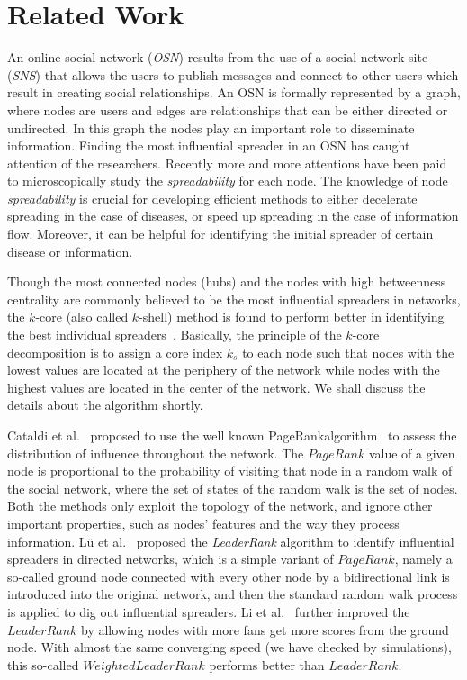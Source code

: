 \documentclass[sigconf]{acmart}
\begin{document}
\section{Related Work}
An online social network (\emph{OSN}) results from the use of a social network site (\emph{SNS}) that allows the users to publish messages and connect to other users which result in creating social relationships. An OSN is formally represented by a graph, where nodes are users and edges are relationships that can be either directed or undirected. In this graph the nodes play an important role to disseminate information. Finding the most influential spreader in an OSN has caught attention of the researchers. Recently more and more attentions have been paid to microscopically study the \emph{spreadability} for each node. The knowledge of node \emph{spreadability} is crucial for developing efficient methods to either decelerate spreading in the case of diseases, or speed up spreading in the case of information flow. Moreover, it can be helpful for identifying the initial spreader of certain disease or information.

Though the most connected nodes (hubs) and the nodes with high betweenness centrality are commonly believed to be the most influential spreaders in networks, the $k$-core (also called $k$-shell) method is found to perform better in identifying the best individual spreaders~\cite{kitsak2010identification,carmi2007model}. Basically, the principle of
the $k$-core decomposition is to assign a core index $k_s$ to each node such that nodes with the lowest values are located at the periphery of the network while nodes with the highest values are located in the center of the network. We shall discuss the details about the algorithm shortly. 

Cataldi et al.~\cite{cataldi2010emerging} proposed to use the well known PageRankalgorithm~\cite{page1999pagerank} to assess the distribution of influence throughout the network. The $PageRank$ value of a given node is proportional to the probability of visiting that node in a random walk of the social network, where the set of states of the random walk is the set of nodes. Both the methods only exploit the topology of the network, and ignore other important properties, such as nodes’ features and the way they process information. L\"u et al.~\cite{lu2011leaders} proposed the \emph{LeaderRank} algorithm to identify influential spreaders in directed networks, which is a simple variant of $PageRank$, namely a so-called ground node connected with every other node by a bidirectional link is introduced into the original network, and then the standard random walk process is applied to dig out influential spreaders. Li et al.~\cite{li2014identifying} further improved the $LeaderRank$ by allowing nodes with more fans get more scores from the ground node. With almost the same converging speed (we have checked by simulations), this so-called $Weighted LeaderRank$ performs better than $LeaderRank$.
\end{document}
